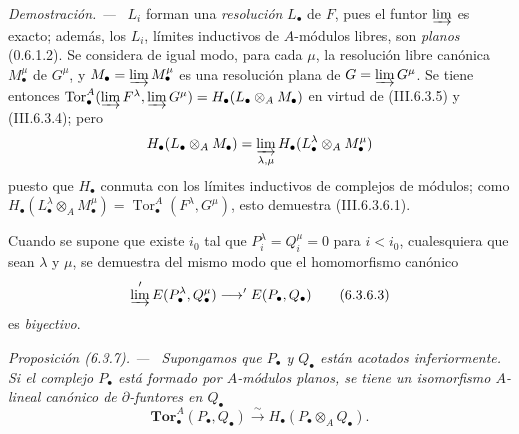 \documentclass[10pt,oneside]{book}
\newcommand{\sref}[2][]{\textup{(#2)}}
\newenvironment{proposition}[1][]{\par\medskip\noindent\itshape Proposición (#1). ---\ }{\par}
\newenvironment{proof}{\par\medskip\noindent\textit{Demostración. ---\ }}{\par}
\begin{document}
\begin{proof}
$L_i$ forman una \emph{resolución} $L_\bullet$ de $F$, pues el funtor
$\varinjlim$ es exacto; además, los $L_i$, límites inductivos de
$A$-módulos libres, son \emph{planos} \sref[0]{0.6.1.2}. Se considera de
igual modo, para cada $\mu$, la resolución libre canónica $M_\bullet^\mu$ de
$G^\mu$, y $M_\bullet=\varinjlim M_\bullet^\mu$ es una resolución plana
de $G=\varinjlim G^\mu$. Se tiene entonces
$\operatorname{Tor}_\bullet^A(\varinjlim F^\lambda,
\varinjlim G^\mu)=H_\bullet(L_\bullet\otimes_A M_\bullet)$ en virtud de
\sref{III.6.3.5} y \sref{III.6.3.4}; pero
\[
  H_\bullet(L_\bullet\otimes_A M_\bullet)
  =\varinjlim_{\lambda,\mu}
   H_\bullet(L_\bullet^\lambda\otimes_A M_\bullet^\mu)
\]
puesto que $H_\bullet$ conmuta con los límites inductivos de complejos de
módulos; como $H_\bullet(L_\bullet^\lambda\otimes_A M_\bullet^\mu)
=\operatorname{Tor}_\bullet^A(F^\lambda,G^\mu)$, esto demuestra
\sref{III.6.3.6.1}.

Cuando se supone que existe $i_0$ tal que
$P_i^\lambda=Q_i^\mu=0$ para $i<i_0$, cualesquiera que sean $\lambda$ y
$\mu$, se demuestra del mismo modo que el homomorfismo canónico
\[
  \varinjlim'E(P_\bullet^\lambda,Q_\bullet^\mu)
  \longrightarrow'E(P_\bullet,Q_\bullet)
  \tag{6.3.6.3}\label{III.6.3.6.3}
\]
es \emph{biyectivo}.
\end{proof}

\begin{proposition}[6.3.7]
\label{III.6.3.7}
Supongamos que $P_\bullet$ y $Q_\bullet$ están acotados inferiormente. Si el
complejo $P_\bullet$ está formado por $A$-módulos planos, se tiene un
isomorfismo $A$-lineal canónico de $\partial$-funtores en $Q_\bullet$
\[
  \mathbf{Tor}_\bullet^A(P_\bullet,Q_\bullet)
  \xrightarrow{\sim}H_\bullet(P_\bullet\otimes_A Q_\bullet).
  \tag{6.3.7.1}\label{III.6.3.7.1}
\]
\end{proposition}
\end{document}
